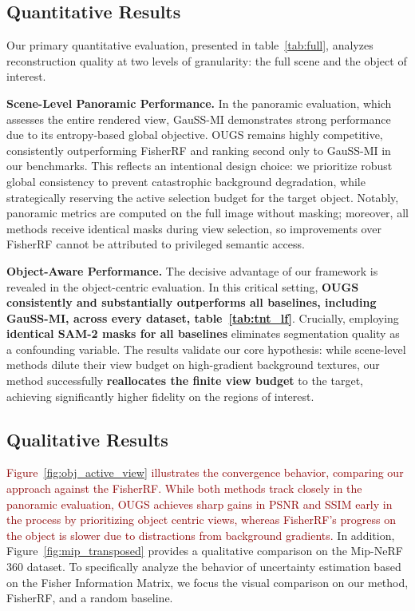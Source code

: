 \documentclass{egpubl}
\newcommand{\pname}[1]{{OUGS}}
\newcommand{\rev}[1]{\textcolor{darkred}{#1}}
\newcommand{\tim}[1]{{\color[rgb]{0.8,0.2,0} Tim: #1}}
\begin{document}
\subsection{Quantitative Results}
\label{OverallRenderingQuality}
Our primary quantitative evaluation, presented in table~\ref{tab:full}, analyzes reconstruction quality at two levels of granularity: the full scene and the object of interest.

\textbf{Scene-Level Panoramic Performance.}
In the panoramic evaluation, which assesses the entire rendered view, GauSS-MI demonstrates strong performance due to its entropy-based global objective. OUGS remains highly competitive, consistently outperforming FisherRF and ranking second only to GauSS-MI in our benchmarks. This reflects an intentional design choice: we prioritize robust global consistency to prevent catastrophic background degradation, while strategically reserving the active selection budget for the target object. Notably, panoramic metrics are computed on the full image without masking; moreover, all methods receive identical masks during view selection, so improvements over FisherRF cannot be attributed to privileged semantic access.


\textbf{Object-Aware Performance.}
The decisive advantage of our framework is revealed in the object-centric evaluation. In this critical setting, \textbf{\pname{} consistently and substantially outperforms all baselines, including GauSS-MI, across every dataset, table~\ref{tab:tnt_lf}}.
Crucially, employing \textbf{identical SAM-2 masks for all baselines} eliminates segmentation quality as a confounding variable.
The results validate our core hypothesis: while scene-level methods dilute their view budget on high-gradient background textures, our method successfully \textbf{reallocates the finite view budget} to the target, achieving significantly higher fidelity on the regions of interest.


\vspace{-2mm}
\subsection{Qualitative Results}
\label{QualitativeResults}


\rev{Figure~\ref{fig:obj_active_view} illustrates the convergence behavior, comparing our approach against the FisherRF. While both methods track closely in the panoramic evaluation, OUGS achieves sharp gains in PSNR and SSIM early in the process by prioritizing object centric views, whereas FisherRF’s progress on the object is slower due to distractions from background gradients.} In addition, Figure~\ref{fig:mip_transposed} provides a qualitative comparison on the Mip-NeRF 360 dataset. To specifically analyze the behavior of uncertainty estimation based on the Fisher Information Matrix, we focus the visual comparison on our method, FisherRF, and a random baseline.
\end{document}
